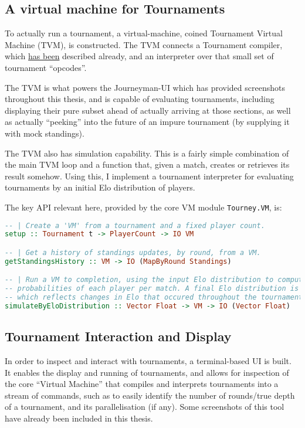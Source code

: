 \documentclass[a4,11pt,twoside,final,hidelinks]{article}
\begin{document}
\subsection{A virtual machine for Tournaments}
\label{sec:org55f9d30}

To actually run a tournament, a virtual-machine, coined Tournament Virtual
Machine (TVM), is constructed. The TVM connects a Tournament compiler, which \hyperref[compiler]{has
been} described already, and an interpreter over that small set of tournament
``opcodes''.

The TVM is what powers the Journeyman-UI which has provided screenshots
throughout this thesis, and is capable of evaluating tournaments, including
displaying their pure subset ahead of actually arriving at those sections, as
well as actually ``peeking'' into the future of an impure tournament (by supplying
it with mock standings).

The TVM also has simulation capability. This is a fairly simple combination of
the main TVM loop and a function that, given a match, creates or retrieves its
result somehow. Using this, I implement a tournament interpreter for evaluating
tournaments by an initial Elo distribution of players.

The key API relevant here, provided by the core VM module \texttt{Tourney.VM}, is:

\begin{lstlisting}[language=haskell,numbers=none]
-- | Create a 'VM' from a tournament and a fixed player count.
setup :: Tournament t -> PlayerCount -> IO VM

-- | Get a history of standings updates, by round, from a VM.
getStandingsHistory :: VM -> IO (MapByRound Standings)

-- | Run a VM to completion, using the input Elo distribution to compute the win
-- probabilities of each player per match. A final Elo distribution is returned
-- which reflects changes in Elo that occured throughout the tournament.
simulateByEloDistribution :: Vector Float -> VM -> IO (Vector Float)
\end{lstlisting}

\subsection{Tournament Interaction and Display}
\label{sec:org2fdccf7}

In order to inspect and interact with tournaments, a terminal-based UI is built.
It enables the display and running of tournaments, and allows for inspection of
the core ``Virtual Machine'' that compiles and interprets tournaments into a
stream of commands, such as to easily identify the number of rounds/true depth
of a tournament, and its parallelisation (if any). Some screenshots of this tool
have already been included in this thesis.
\end{document}
